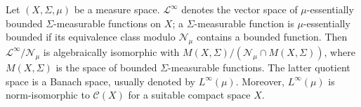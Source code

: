 Let $(X, \Sigma, \mu)$ be a measure space. $\mathscr{L}^\infty$ denotes the vector space of $\mu$-essentially bounded $\Sigma$-measurable functions on $X$; a $\Sigma$-measurable function is $\mu$-essentially bounded if its equivalence class modulo $\mathcal{N}_\mu$ contains a bounded function. Then $\mathscr{L}^\infty / \mathcal{N}_\mu$ is algebraically isomorphic with $M(X, \Sigma) / (\mathcal{N}_\mu \cap M(X, \Sigma))$, where $M(X, \Sigma)$ is the space of bounded $\Sigma$-measurable functions. The latter quotient space is a Banach space, usually denoted by $L^\infty(\mu)$. Moreover, $L^\infty(\mu)$ is norm-isomorphic to $\mathcal{C}(X)$ for a suitable compact space $X$.
